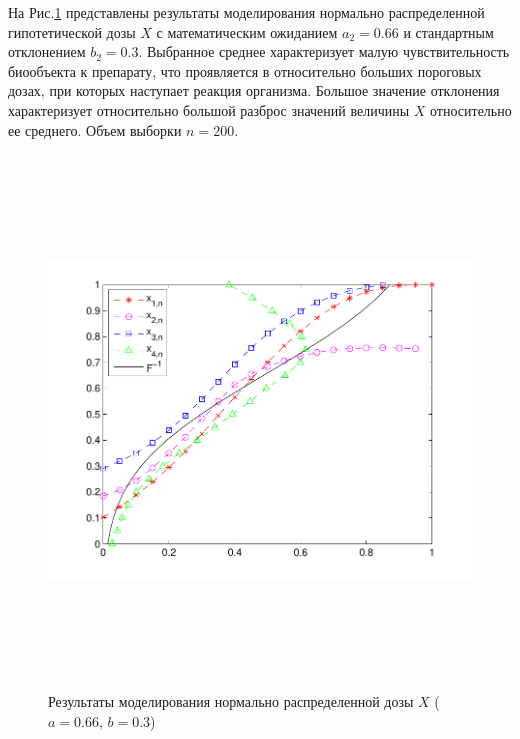 \documentclass[a4paper,14pt,russian]{article}
\begin{document}
На Рис.\ref{Pic4} представлены результаты моделирования нормально распределенной гипотетической дозы $X$ с математическим ожиданием $a_2 = 0.66$ и стандартным отклонением $b_2 = 0.3$. Выбранное среднее характеризует малую чувствительность биообъекта к препарату, что проявляется в относительно больших пороговых дозах, при которых наступает реакция организма. Большое значение отклонения характеризует относительно большой разброс значений величины $X$ относительно ее среднего. Объем выборки $n = 200$.
\begin{figure}[h]
\center
\caption{Результаты моделирования нормально распределенной дозы $X$ ($a=0.66$,  $b=0.3$)}\label{Pic4}
\includegraphics[width = 500pt,height = 400pt]{10.pdf}
\end{figure}
\newpage
\end{document}
